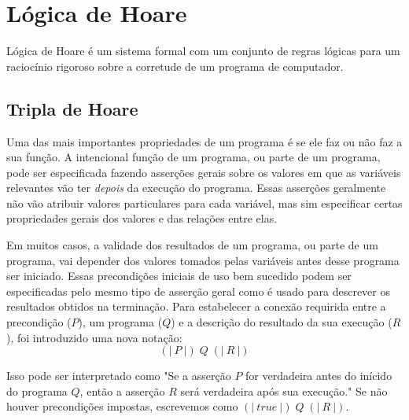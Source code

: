 \section{Lógica de Hoare}
\label{sec:LógicadeHoare}

Lógica de Hoare é um sistema formal com um conjunto de regras lógicas para um
raciocínio rigoroso sobre a corretude de um programa de computador.

\subsection{Tripla de Hoare}
\label{sub:tripla}

Uma das mais importantes propriedades de um programa é se ele faz ou não faz a
sua função. A intencional função de um programa, ou parte de um programa, pode
ser especificada fazendo asserções gerais sobre os valores em que as variáveis
relevantes vão ter \emph{depois} da execução do programa. Essas asserções
geralmente não vão atribuir valores particulares para cada variável, mas sim
especificar certas propriedades gerais dos valores e das relações entre elas.

Em muitos casos, a validade dos resultados de um programa, ou parte de um
programa, vai depender dos valores tomados pelas variáveis antes desse programa
ser iniciado. Essas precondições iniciais de uso bem sucedido podem ser
especificadas pelo mesmo tipo de asserção geral como é usado para descrever os
resultados obtidos na terminação. Para estabelecer a conexão requirida entre a
precondição ($P$), um programa ($Q$) e a descrição do resultado da sua execução
($R$), foi introduzido uma nova notação: \[(\!|\  P\  |\!)\; Q\; (\!|\  R\
|\!)\]

Isso pode ser interpretado como "Se a asserção $P$ for verdadeira antes do
inícido do programa $Q$, então a asserção $R$ será verdadeira após sua
execução." Se não houver precondições impostas, escrevemos como  $(\!|\  true\
|\!)\; Q\; (\!|\  R\ |\!)$\cite{hoare:68}.

